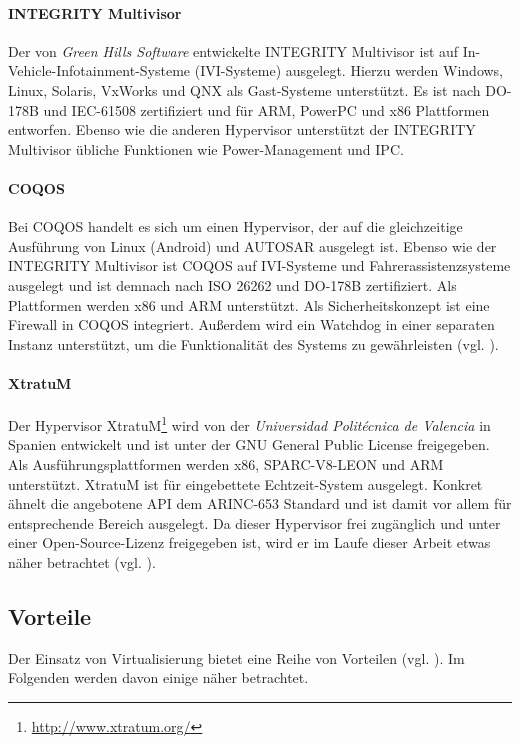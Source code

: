 \documentclass[
  a4paper,					    %
  twoside,
  DIV=calc,     				%
  bibliography=totoc,
  cleardoublepage=empty,
  ngerman,     					%
  final       					%
]{scrbook}
\begin{document}
\paragraph{INTEGRITY Multivisor}
Der von \emph{Green Hills Software} entwickelte INTEGRITY Multivisor ist auf In-Vehicle-Infotainment-Systeme (IVI-Systeme) ausgelegt. Hierzu werden Windows, Linux, Solaris, VxWorks und QNX als Gast-Systeme unterstützt. Es ist nach DO-178B und IEC-61508 zertifiziert und für ARM, PowerPC und x86 Plattformen entworfen. Ebenso wie die anderen Hypervisor unterstützt der INTEGRITY Multivisor übliche Funktionen wie Power-Management und IPC.

\paragraph{COQOS}
Bei COQOS handelt es sich um einen Hypervisor, der auf die gleichzeitige Ausführung von Linux (Android) und AUTOSAR ausgelegt ist. Ebenso wie der INTEGRITY Multivisor ist COQOS auf IVI-Systeme und Fahrerassistenzsysteme ausgelegt und ist demnach nach ISO 26262 und DO-178B zertifiziert. Als Plattformen werden x86 und ARM unterstützt. Als Sicherheitskonzept ist eine Firewall in COQOS integriert. Außerdem wird ein Watchdog in einer separaten Instanz unterstützt, um die Funktionalität des Systems zu gewährleisten (vgl. \cite{coqos}).

\paragraph{XtratuM}
Der Hypervisor XtratuM\footnote{\url{http://www.xtratum.org/}} wird von der \emph{Universidad Politécnica de Valencia} in Spanien entwickelt und ist unter der GNU General Public License freigegeben. Als Ausführungsplattformen werden x86, SPARC-V8-LEON und ARM unterstützt. XtratuM ist für eingebettete Echtzeit-System ausgelegt. Konkret ähnelt die angebotene API dem ARINC-653 Standard und ist damit vor allem für entsprechende Bereich ausgelegt. Da dieser Hypervisor frei zugänglich und unter einer Open-Source-Lizenz freigegeben ist, wird er im Laufe dieser Arbeit etwas näher betrachtet (vgl. \cite{xm:usermanual}).





\subsection{Vorteile}
Der Einsatz von Virtualisierung bietet eine Reihe von Vorteilen (vgl. \cite{wiki:emb_hyp}). Im Folgenden werden davon einige näher betrachtet.
\end{document}
